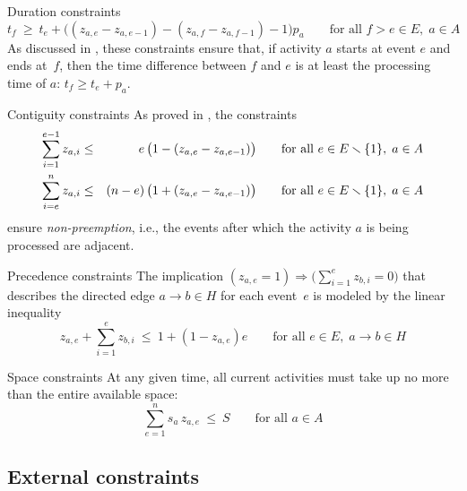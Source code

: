\documentclass[11pt,reqno]{amsart}
\newcommand{\lra}{\longrightarrow}
\numberwithin{equation}{section}
\begin{document}
\begin{mydesc}
\item[Duration constraints]
  \begin{equation}
     t_f 
     \ \ge \
     t_e + \big((z_{a,e} - z_{a,e-1} ) - (z_{a,f} - z_{a,f-1}) - 1\big) p_a
     \qquad\text{for all } f>e\in E,\; a\in A
  \end{equation}
  As discussed in \cite{artigues-etal11}, these constraints ensure that,
if activity $a$ starts at event $e$ and ends at~$f$, then the time difference between  $f$
and $e$ is at least the processing time of $a$: $t_f \ge t_e + p_a$.

\item[Contiguity constraints] As proved in \cite[Proposition 1]{artigues-etal11a}, the
  constraints
  \begin{eqnarray}
    \sum_{i=1}^{e-1} z_{a,i}
    &\le&
    \phantom{(n-e)}\llap{$e$}\,\big(1-(z_{a,e} - z_{a,e-1})\big)
    \qquad\text{for all } e\in E\smallsetminus\{1\},\; a\in A
    \\
    \sum_{i=e}^n z_{a,i}
    &\le&
    (n-e)\,\big(1+(z_{a,e} - z_{a,e-1})\big)
    \qquad\text{for all } e\in E\smallsetminus\{1\},\; a\in A
  \end{eqnarray}
  ensure \emph{non-preemption}, i.e., the events after which the activity $a$ is being
  processed are adjacent.

\item[Precedence constraints] The implication $(z_{a,e}=1) \Longrightarrow
  \big(\sum_{i=1}^{e} z_{b,i}=0\big)$ that describes the directed edge $a\lra b\in H$ for
  each event~$e$ is modeled by the linear inequality
  \begin{equation}
     z_{a,e} + \sum_{i=1}^e z_{b,i}
     \ \le \
     1+(1-z_{a,e})e
     \qquad\text{for all } e\in E,\; a\lra b\in H
  \end{equation}

\item[Space constraints] At any given time, all current activities must take up no more
  than the entire available space:
  \begin{equation}
    \sum_{e=1}^n s_a \, z_{a,e} 
    \ \le \
    S \qquad\text{for all } a\in A
  \end{equation}
\end{mydesc}

\subsection{External constraints}
\end{document}
